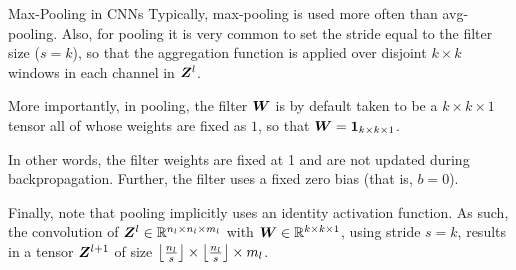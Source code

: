 %
\begin{frame}{Max-Pooling in CNNs}
Typically, max-pooling is used more often than avg-pooling. Also, 
for pooling it is very common to set the stride equal to the filter size
($s=k$), so that the aggregation
function is applied over disjoint $k \times k$ windows in each channel in
${\boldsymbol Z}^l$.

\medskip


More importantly, in pooling, the filter ${\boldsymbol W}$ is by default taken to be a 
$k \times k \times 1$ tensor all of whose weights are fixed as $1$, so
that ${\boldsymbol W} = \mathbf{1}_{k \times k \times 1}$. 

	\medskip

	In other words, the filter
weights are fixed at 1 and are not updated during backpropagation.
Further, the filter uses a fixed zero bias 
(that is, $b = 0$).


\medskip

Finally, note that pooling implicitly uses an identity activation function.
As such, the convolution of ${\boldsymbol Z}^l \in {\mathord{\mathbb R}}^{n_l \times n_l
\times m_l}$ with ${\boldsymbol W} \in
{\mathord{\mathbb R}}^{k \times k \times 1}$, using stride
$s=k$, results in a tensor ${\boldsymbol Z}^{l+1}$ 
of size $\left\lfloor\frac{n_l}{s}\right\rfloor
\times \left\lfloor\frac{n_l}{s}\right\rfloor \times m_l$.
\end{frame}
%
%
